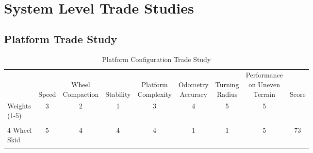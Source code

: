 \documentclass{article}
\begin{document}
\section{System Level Trade Studies}
	\subsection{Platform Trade Study}
	
		\begin{table}[H]
		\begin{adjustwidth}{-1in}{-1in}
		\centering
		\setlength{\dashlinedash}{.5pt}
		\setlength\tabcolsep{4pt}
		\def\arraystretch{1.9}
		
		\caption{Platform Configuration Trade Study}
		\label{PlatformConfigTable}
		\vspace{1em}

		\begin{tabular}{lcccccccc}
                                                                                  & \makecell{\\ \\ Speed} & \makecell{\\ Wheel \\ Compaction} & \makecell{\\ \\ Stability} & \makecell{\\ Platform \\ Complexity} & \makecell{\\ Odometry \\ Accuracy} & \makecell{\\ Turning \\ Radius } & \makecell{Performance \\ on Uneven \\ Terrain} & \makecell{\\ \\ Score} \\ \hdashline
		\makecell[l]{Weights \\ (1-5)}                                            & 3     & 2                & 1         & 3                   & 4                 & 5                                          & 5                             &       \\ \hline
		
		\\[-3ex]
		\makecell[l]{4 Wheel \\ Skid}                                             & 5     & 4                & 4         & 4                   & 1                 & 1                                          & 5                             & 73    \\ \hdashline 
		

\end{tabular}
\end{adjustwidth}
\end{table}
\end{document}
